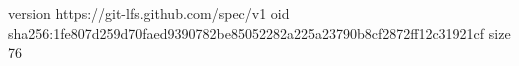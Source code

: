 version https://git-lfs.github.com/spec/v1
oid sha256:1fe807d259d70faed9390782be85052282a225a23790b8cf2872ff12c31921cf
size 76

